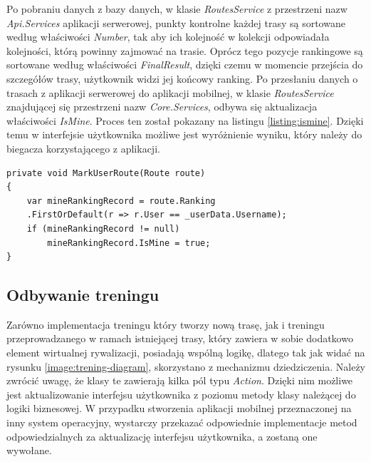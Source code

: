 Po pobraniu danych z bazy danych, w klasie \textit{RoutesService} z przestrzeni nazw \textit{Api.Services} aplikacji serwerowej, punkty kontrolne każdej trasy są sortowane według właściwości \textit{Number}, tak aby ich kolejność w kolekcji odpowiadała kolejności, którą powinny zajmować na trasie. Oprócz tego pozycje rankingowe są sortowane według właściwości \textit{FinalResult}, dzięki czemu w momencie przejścia do szczegółów trasy, użytkownik widzi jej końcowy ranking. Po przesłaniu danych o trasach z aplikacji serwerowej do aplikacji mobilnej, w klasie \textit{RoutesService} znajdującej się przestrzeni nazw \textit{Core.Services}, odbywa się aktualizacja właściwości \textit{IsMine}. Proces ten został pokazany na listingu \ref{listing:ismine}. Dzięki temu w interfejsie użytkownika możliwe jest wyróżnienie wyniku, który należy do biegacza korzystającego z aplikacji.
\begin{lstlisting}[caption={Aktualizacja właściwości IsMine klasy Route},label=listing:ismine]
private void MarkUserRoute(Route route)
{
	var mineRankingRecord = route.Ranking
	.FirstOrDefault(r => r.User == _userData.Username);
	if (mineRankingRecord != null)
		mineRankingRecord.IsMine = true;
}
\end{lstlisting}

\subsection{Odbywanie treningu}\label{chap:trening}
Zarówno implementacja treningu który tworzy nową trasę, jak i treningu przeprowadzanego w ramach istniejącej trasy, który zawiera w sobie dodatkowo element wirtualnej rywalizacji, posiadają wspólną logikę, dlatego tak jak widać na rysunku \ref{image:trening-diagram}, skorzystano z mechanizmu dziedziczenia. Należy zwrócić uwagę, że klasy te zawierają kilka pól typu \textit{Action}. Dzięki nim możliwe jest aktualizowanie interfejsu użytkownika z poziomu metody klasy należącej do logiki biznesowej. W przypadku stworzenia aplikacji mobilnej przeznaczonej na inny system operacyjny, wystarczy przekazać odpowiednie implementacje metod odpowiedzialnych za aktualizację interfejsu użytkownika, a zostaną one wywołane. 

